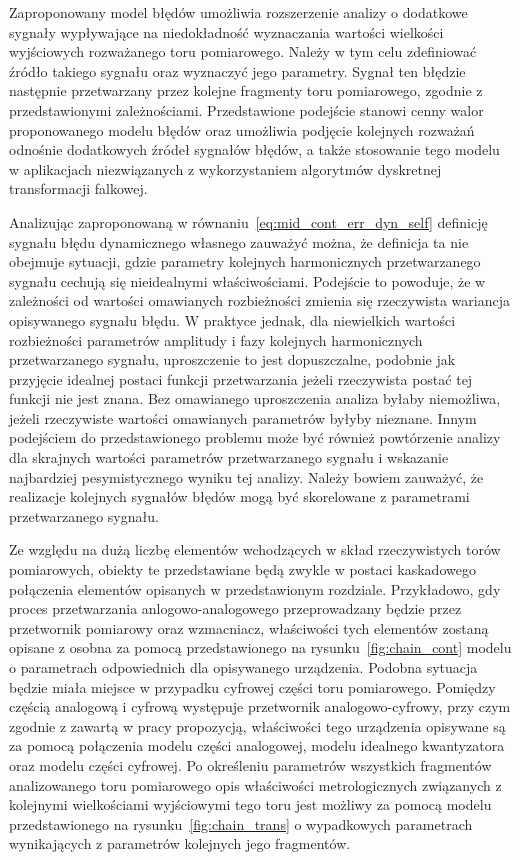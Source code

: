 Zaproponowany model błędów umożliwia rozszerzenie analizy o dodatkowe sygnały wypływające na niedokładność wyznaczania wartości wielkości wyjściowych rozważanego toru pomiarowego. Należy w tym celu zdefiniować źródło takiego sygnału oraz wyznaczyć jego parametry. Sygnał ten błędzie następnie przetwarzany przez kolejne fragmenty toru pomiarowego, zgodnie z przedstawionymi zależnościami. Przedstawione podejście stanowi cenny walor proponowanego modelu błędów oraz umożliwia podjęcie kolejnych rozważań odnośnie dodatkowych źródeł sygnałów błędów, a także stosowanie tego modelu w aplikacjach niezwiązanych z wykorzystaniem algorytmów dyskretnej transformacji falkowej.

Analizując zaproponowaną w równaniu~\eqref{eq:mid_cont_err_dyn_self} definicję sygnału błędu dynamicznego własnego zauważyć można, że definicja ta nie obejmuje sytuacji, gdzie parametry kolejnych harmonicznych przetwarzanego sygnału cechują się nieidealnymi właściwościami. Podejście to powoduje, że w zależności od wartości omawianych rozbieżności zmienia się rzeczywista wariancja opisywanego sygnału błędu. W praktyce jednak, dla niewielkich wartości rozbieżności parametrów amplitudy i fazy kolejnych harmonicznych przetwarzanego sygnału, uproszczenie to jest dopuszczalne, podobnie jak przyjęcie idealnej postaci funkcji przetwarzania jeżeli rzeczywista postać tej funkcji nie jest znana. Bez omawianego uproszczenia analiza byłaby niemożliwa, jeżeli rzeczywiste wartości omawianych parametrów byłyby nieznane. Innym podejściem do przedstawionego problemu może być również powtórzenie analizy dla skrajnych wartości parametrów przetwarzanego sygnału i wskazanie najbardziej pesymistycznego wyniku tej analizy. Należy bowiem zauważyć, że realizacje kolejnych sygnałów błędów mogą być skorelowane z parametrami przetwarzanego sygnału.

Ze względu na dużą liczbę elementów wchodzących w skład rzeczywistych torów pomiarowych, obiekty te przedstawiane będą zwykle w postaci kaskadowego połączenia elementów opisanych w przedstawionym rozdziale. Przykładowo, gdy proces przetwarzania anlogowo-analogowego przeprowadzany będzie przez przetwornik pomiarowy oraz wzmacniacz, właściwości tych elementów zostaną opisane z osobna za pomocą przedstawionego na rysunku~\ref{fig:chain_cont} modelu o parametrach odpowiednich dla opisywanego urządzenia. Podobna sytuacja będzie miała miejsce w przypadku cyfrowej części toru pomiarowego. Pomiędzy częścią analogową i cyfrową występuje przetwornik analogowo-cyfrowy, przy czym zgodnie z zawartą w pracy propozycją, właściwości tego urządzenia opisywane są za pomocą połączenia modelu części analogowej, modelu idealnego kwantyzatora oraz modelu części cyfrowej. Po określeniu parametrów wszystkich fragmentów analizowanego toru pomiarowego opis właściwości metrologicznych związanych z kolejnymi wielkościami wyjściowymi tego toru jest możliwy za pomocą modelu przedstawionego na rysunku~\ref{fig:chain_trans} o wypadkowych parametrach wynikających z parametrów kolejnych jego fragmentów.

